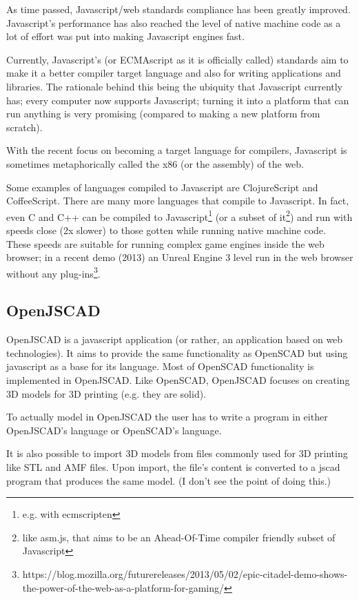 \documentclass{./llncs2e/llncs}
\begin{document}
	As time passed, Javascript/web standards compliance has been greatly improved.
	Javascript's performance has also reached the level of native machine code as a lot of effort was put into making Javascript engines fast.

	Currently, Javascript's (or ECMAscript as it is officially called) standards aim to make it a better compiler target language and also for writing applications and libraries.
	The rationale behind this being the ubiquity that Javascript currently has; every computer now supports Javascript; turning it into a platform that can run anything is very promising (compared to making a new platform from scratch).

	With the recent focus on becoming a target language for compilers, Javascript is sometimes metaphorically called the x86 (or the assembly) of the web.

	Some examples of languages compiled to Javascript are ClojureScript and CoffeeScript.
	There are many more languages that compile to Javascript. 
	In fact, even C and C++ can be compiled to Javascript\footnote{e.g. with ecmscripten} (or a subset of it\footnote{like asm.js, that aims to be an Ahead-Of-Time compiler friendly subset of Javascript}) and run with speeds close (2x slower) to those gotten while running native machine code. These speeds are suitable for running complex game engines inside the web browser; in a recent demo (2013) an Unreal Engine 3 level run in the web browser without any plug-ins\footnote{https://blog.mozilla.org/futurereleases/2013/05/02/epic-citadel-demo-shows-the-power-of-the-web-as-a-platform-for-gaming/}.

\subsection{OpenJSCAD}
	OpenJSCAD is a javascript application (or rather, an application based on web technologies).
	It aims to provide the same functionality as OpenSCAD but using javascript as a base for its language. 
	Most of OpenSCAD functionality is implemented in OpenJSCAD. 
	Like OpenSCAD, OpenJSCAD focuses on creating 3D models for 3D printing (e.g. they are solid).

	To actually model in OpenJSCAD the user has to write a program in either OpenJSCAD's language or OpenSCAD's language.

	It is also possible to import 3D models from files commonly used for 3D printing like STL and AMF files.
	Upon import, the file's content is converted to a jscad program that produces the same model. (I don't see the point of doing this.)
\end{document}
